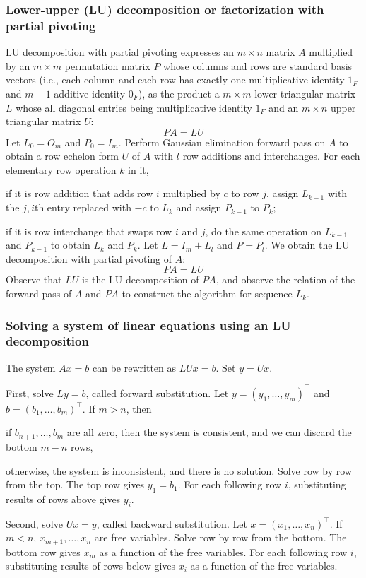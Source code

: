 \documentclass[a4paper,12pt]{report}
\begin{document}
\subsubsection{Lower-upper (LU) decomposition or factorization with partial pivoting}
LU decomposition with partial pivoting expresses an $m\times n$ matrix $A$ multiplied by an $m\times m$ permutation matrix $P$ whose columns and rows are standard basis vectors (i.e., each column and each row has exactly one multiplicative identity $1_F$ and $m-1$ additive identity $0_F$), as the product a $m\times m$ lower triangular matrix $L$ whose all diagonal entries being multiplicative identity $1_F$ and an $m\times n$ upper triangular matrix $U$:
\[PA=LU\]
Let $L_0=O_m$ and $P_0=I_m$. Perform Gaussian elimination forward pass on $A$ to obtain a row echelon form $U$ of $A$ with $l$ row additions and interchanges. For each elementary row operation $k$ in it,
\bit
\item if it is row addition that adds row $i$ multiplied by $c$ to row $j$, assign $L_{k-1}$ with the $j,i$th entry replaced with $-c$ to $L_k$ and assign $P_{k-1}$ to $P_k$;
\item if it is row interchange that swaps row $i$ and $j$, do the same operation on $L_{k-1}$ and $P_{k-1}$ to obtain $L_k$ and $P_k$.
\eit
Let $L=I_m+L_l$ and $P=P_l$. We obtain the LU decomposition with partial pivoting of $A$:
\[PA=LU\]
\bpr
Observe that $LU$ is the LU decomposition of $PA$, and observe the relation of the forward pass of $A$ and $PA$ to construct the algorithm for sequence $L_k$.
\epr
\subsubsection{Solving a system of linear equations using an LU decomposition}
The system $Ax=b$ can be rewritten as $LUx=b$. Set $y=Ux$.

First, solve $Ly=b$, called forward substitution. Let $y=(y_1,\ldots,y_m)^\top$ and $b=(b_1,\ldots,b_m)^\top$. If $m>n$, then
\bit
\item if $b_{n+1},\ldots,b_m$ are all zero, then the system is consistent, and we can discard the bottom $m-n$ rows,
\item otherwise, the system is inconsistent, and there is no solution.
\eit
Solve row by row from the top. The top row gives $y_1=b_1$. For each following row $i$, substituting results of rows above gives $y_i$.

Second, solve $Ux=y$, called backward substitution. Let $x=(x_1,\ldots,x_n)^\top$. If $m<n$, $x_{m+1},\ldots,x_n$ are free variables. Solve row by row from the bottom. The bottom row gives $x_m$ as a function of the free variables. For each following row $i$, substituting results of rows below gives $x_i$ as a function of the free variables.
\end{document}
